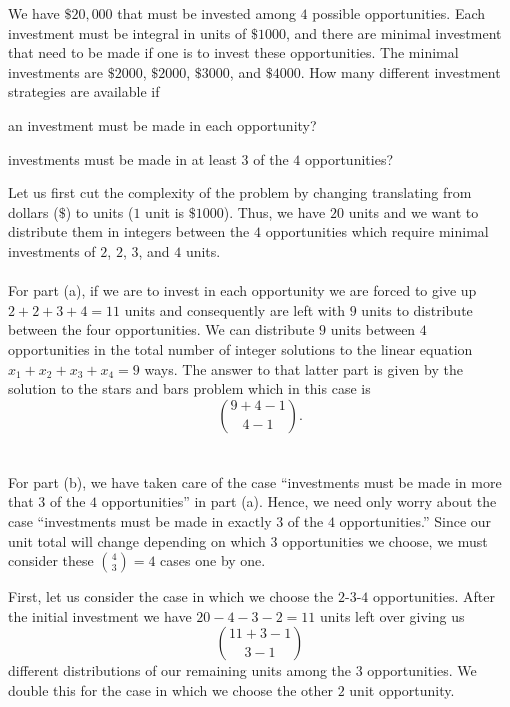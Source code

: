 \begin{problem}[Ross, \S 1, \# 33]
  We have \(\$ 20,\!000\) that must be invested among \(4\) possible
  opportunities. Each investment must be integral in units of \(\$1000\),
  and there are minimal investment that need to be made if one is to invest
  these opportunities. The minimal investments are \(\$2000\), \(\$2000\),
  \(\$3000\), and \(\$4000\). How many different investment strategies are
  available if
  \begin{alphlist}
  \item an investment must be made in each opportunity?
  \item investments must be made in at least \(3\) of the \(4\)
    opportunities?
  \end{alphlist}
\end{problem}
\begin{solution*}
  Let us first cut the complexity of the problem by changing translating
  from dollars (\(\$\)) to units (\(1\) unit is \(\$1000\)). Thus, we have
  \(20\) units and we want to distribute them in integers between the \(4\)
  opportunities which require minimal investments of \(2\), \(2\), \(3\),
  and \(4\) units.
  \\\\
  For part (a), if we are to invest in each opportunity we are forced to
  give up \(2+2+3+4=11\) units and consequently are left with \(9\) units
  to distribute between the four opportunities. We can distribute \(9\)
  units between \(4\) opportunities in the total number of integer
  solutions to the linear equation \(x_1+x_2+x_3+x_4=9\) ways. The answer
  to that latter part is given by the solution to the stars and bars
  problem which in this case is
  \[
    \binom{9+4-1}{4-1}.
  \]
  \\\\
  For part (b), we have taken care of the case ``investments must be made
  in more that \(3\) of the \(4\) opportunities'' in part (a). Hence, we
  need only worry about the case ``investments must be made in exactly
  \(3\) of the \(4\) opportunities.'' Since our unit total will change
  depending on which \(3\) opportunities we choose, we must consider these
  \(\binom{4}{3}=4\) cases one by one.

  First, let us consider the case in which we choose the \(2\)-\(3\)-\(4\)
  opportunities. After the initial investment we have \(20-4-3-2=11\) units
  left over giving us
  \[
    \binom{11+3-1}{3-1}
  \]
  different distributions of our remaining units among the \(3\)
  opportunities. We double this for the case in which we choose the other
  \(2\) unit opportunity.


\end{solution*}
